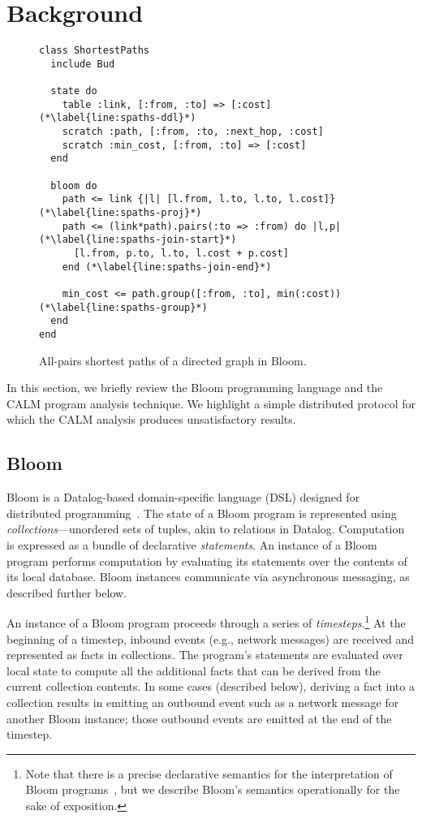 \section{Background}
\label{sec:background}

\begin{figure}[t]
\begin{scriptsize}
\begin{lstlisting}
class ShortestPaths
  include Bud

  state do
    table :link, [:from, :to] => [:cost] (*\label{line:spaths-ddl}*)
    scratch :path, [:from, :to, :next_hop, :cost]
    scratch :min_cost, [:from, :to] => [:cost]
  end

  bloom do
    path <= link {|l| [l.from, l.to, l.to, l.cost]} (*\label{line:spaths-proj}*)
    path <= (link*path).pairs(:to => :from) do |l,p| (*\label{line:spaths-join-start}*)
      [l.from, p.to, l.to, l.cost + p.cost]
    end (*\label{line:spaths-join-end}*)

    min_cost <= path.group([:from, :to], min(:cost)) (*\label{line:spaths-group}*)
  end
end
\end{lstlisting}
\end{scriptsize}
\caption{All-pairs shortest paths of a directed graph in Bloom.}
\label{fig:bloom-spaths}
\end{figure}

In this section, we briefly review the Bloom programming language and the CALM
program analysis technique.  We highlight a simple distributed protocol for
which the CALM analysis produces unsatisfactory results.

\subsection{Bloom}
\label{sec:bg-bloom}

Bloom is a Datalog-based domain-specific language (DSL) designed for distributed
programming~\cite{Alvaro2011,bloom}. The state of a Bloom program is represented
using \emph{collections}---unordered sets of tuples, akin to relations in
Datalog. Computation is expressed as a bundle of declarative \emph{statements}.
An instance of a Bloom program performs computation by evaluating its statements
over the contents of its local database. Bloom instances communicate via
asynchronous messaging, as described further below.

An instance of a Bloom program proceeds through a series of
\emph{timesteps}.\footnote{Note that there is a precise declarative semantics
  for the interpretation of Bloom programs~\cite{dedalus}, but we describe
  Bloom's semantics operationally for the sake of exposition.} At the beginning
of a timestep, inbound events (e.g., network messages) are received and
represented as facts in collections. The program's statements are evaluated over
local state to compute all the additional facts that can be derived from the
current collection contents. In some cases (described below), deriving a fact
into a collection results in emitting an outbound event such as a network
message for another Bloom instance; those outbound events are emitted at the end
of the timestep.

